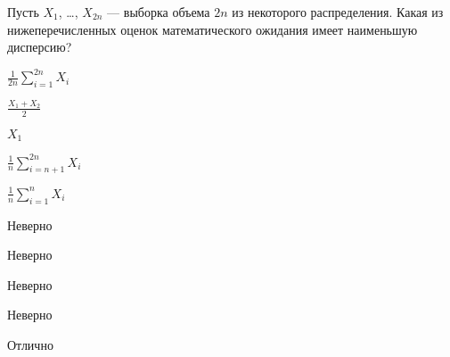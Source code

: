 
\begin{question}
Пусть \(X_1\), \ldots, \(X_{2 n}\) --- выборка объема \(2 n\) из
некоторого распределения. Какая из нижеперечисленных оценок
математического ожидания имеет наименьшую дисперсию?
\begin{answerlist}
  \item \(\frac{1}{2n}\sum_{i=1}^{2n}X_i\)
  \item \(\frac{X_1+X_2}{2}\)
  \item \(X_1\)
  \item \(\frac{1}{n}\sum_{i=n+1}^{2n}X_i\)
  \item \(\frac{1}{n}\sum_{i=1}^n X_i\)
\end{answerlist}
\end{question}

\begin{solution}
\begin{answerlist}
  \item Неверно
  \item Неверно
  \item Неверно
  \item Неверно
  \item Отлично
\end{answerlist}
\end{solution}

